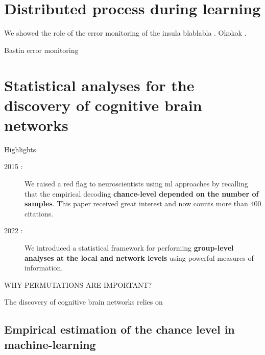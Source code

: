 \documentclass[a4paper,11pt]{article}
\begin{document}
\section{Distributed process during learning}




We showed the role of the error monitoring of the insula blablabla \citep{bastin2016direct}. Okokok \citep{gueguen2021anatomical}.

Bastin error monitoring



\section{Statistical analyses for the discovery of cognitive brain networks}

\begin{highlights}{Highlights}
    \begin{description}
        \item[2015 :] We raised a red flag to neuroscientists using \ac{ml} approaches by recalling that the empirical decoding \textbf{chance-level depended on the number of samples}. This paper received great interest and now counts more than 400 citations.
        \item[2022 :] We introduced a statistical framework for performing \textbf{group-level analyses at the local and network levels} using powerful measures of information.
    \end{description}


\tcblower
\cite{combrisson2015exceeding,combrisson2022grouplevel}

\end{highlights}

WHY PERMUTATIONS ARE IMPORTANT?

The discovery of cognitive brain networks relies on

\subsection{Empirical estimation of the chance level in machine-learning}
\end{document}
